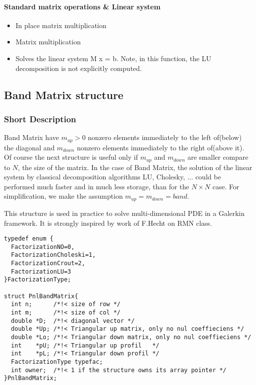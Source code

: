 \paragraph{Standard matrix operations \& Linear system}
\begin{itemize}
\item {}
  \sshortdescribe In place matrix multiplication  
\item {}
  \sshortdescribe Matrix multiplication  
\item {}
  \sshortdescribe Solves the linear system M x = b. Note, in this function, the LU decomposition
  is not explicitly computed.
\end{itemize}



\subsection{Band Matrix structure}
\subsubsection{Short Description}


Band Matrix have $m_{up}>0$ nonzero elements immediately to the left of(below)
the diagonal and $m_{down}$ nonzero elements immediately to the right of(above
it). Of course the next structure is useful only if $m_{up}$ and $m_{down}$
are smaller compare to $N$, the size of the matrix. In the case of Band
Matrix, the solution of the linear system by classical decomposition algorithms
LU, Cholesky, $\dots$ could be performed much faster and in much less storage, 
than for the $N\times N $ case. For simplification, we make the assumption $m_{up}=m_{down}=band$.


This structure is used in practice to solve multi-dimensional PDE in a Galerkin
framework. It is strongly inspired by work of F.Hecht on RMN class. 


\begin{verbatim}
typedef enum {
  FactorizationNO=0, 
  FactorizationCholeski=1, 
  FactorizationCrout=2, 
  FactorizationLU=3
}FactorizationType;

struct PnlBandMatrix{
  int n;      /*!< size of row */ 
  int m;      /*!< size of col */ 
  double *D;  /*!< diagonal vector */  
  double *Up; /*!< Triangular up matrix, only no nul coeffieciens */ 
  double *Lo; /*!< Triangular down matrix, only no nul coeffieciens */
  int    *pU; /*!< Triangular up profil   */ 
  int    *pL; /*!< Triangular down profil */
  FactorizationType typefac;
  int owner;  /*!< 1 if the structure owns its array pointer */
}PnlBandMatrix;
\end{verbatim}

